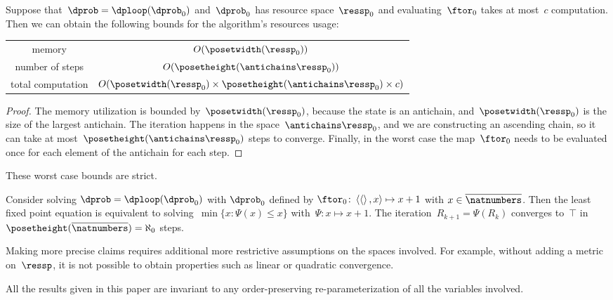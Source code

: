 \begin{proposition}
  \label{prop:complexity}
  Suppose that~$\dprob=\dploop(\dprob_{0})$ and~$\dprob_{0}$ has resource space~$\ressp_{0}$ and evaluating~$\ftor_{0}$ takes at most~$c$ computation. Then we can obtain the following bounds for the algorithm's resources usage:

  \smallskip{}
  \begin{tabular}{cc}
    memory & $O(\posetwidth(\ressp_{0}))$\tabularnewline
    number of steps & $O(\posetheight(\antichains\ressp_{0}))$\tabularnewline
    total computation & $O(\posetwidth(\ressp_{0})\times\posetheight(\antichains\ressp_{0})\times c)$\tabularnewline
  \end{tabular}

\end{proposition}
\begin{proof}
  The memory utilization is bounded by~$\posetwidth(\ressp_{0})$, because the state is an antichain, and~$\posetwidth(\ressp_{0})$ is the size of the largest antichain. The iteration happens in the space~$\antichains\ressp_{0}$, and we are constructing an ascending chain, so it can take at most~$\posetheight(\antichains\ressp_{0})$ steps to converge. Finally, in the worst case the map~$\ftor_{0}$ needs to be evaluated once for each element of the antichain for each step.
\end{proof}
These worst case bounds are strict.
\begin{example}
  Consider solving $\dprob=\dploop(\dprob_{0})$ with $\dprob_{0}$
  defined by $\ftor_{0}\colon\left\langle \left\langle \right\rangle ,x\right\rangle \mapsto x+1$
  with $x\in\overline{\natnumbers}$. Then the least fixed point equation
  is equivalent to solving~$\min\{x\colon\Psi(x)\leq x\}$ with~$\Psi:x\mapsto x+1$.
  The iteration~$R_{k+1}=\Psi(R_{k})$ converges to~$\top$ in~$\posetheight(\overline{\natnumbers})=\aleph_{0}$
  steps.
\end{example}

\begin{remark}
  Making more precise claims requires additional more restrictive assumptions
  on the spaces involved. For example, without adding a metric on~$\ressp$,
  it is not possible to obtain properties such as linear or quadratic
  convergence.
\end{remark}

\begin{remark}
  All the results given in this paper are invariant to any order-preserving
  re-parameterization of all the variables involved.
\end{remark}

